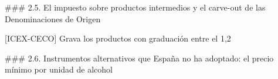 \documentclass[10pt,a4paper]{article}
\begin{document}
### 2.5. El impuesto sobre productos intermedios y el carve-out de las Denominaciones de Origen

[ICEX-CECO] Grava los productos con graduación entre el 1,2%

### 2.6. Instrumentos alternativos que España no ha adoptado: el precio mínimo por unidad de alcohol
\end{document}

